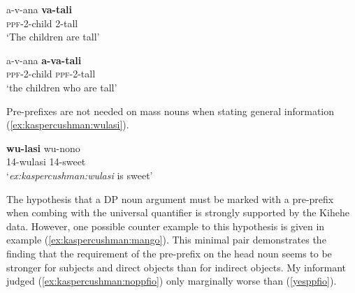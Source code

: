 \documentclass[output=paper,modfonts,nonflat]{langsci/langscibook}
\begin{document}
\begin{exe}

\ex \label{ex:kaspercushman:tall} \begin{xlist}

\ex 
\gll a-v-ana \textbf{va-tali} \\
\textsc{ppf}-2-child 2-tall  \\
\glt `The children are tall'


\ex 
\gll a-v-ana \textbf{a-va-tali} \\
\textsc{ppf}-2-child \textsc{ppf}-2-tall \\
\glt `the children who are tall'

\end{xlist}
\end{exe}

Pre-prefixes are not needed on mass nouns when stating general information (\ref{ex:kaspercushman:wulasi}). 


\begin{exe}

\ex \label{ex:kaspercushman:wulasi} 
\gll \textbf{wu-lasi} wu-nono \\
14-wulasi 14-sweet \\
\glt `\textit{ex:kaspercushman:wulasi} is sweet'

\end{exe}

The hypothesis that a DP noun argument must be marked with a pre-prefix when combing with the universal quantifier is strongly supported by the Kihehe data.  However, one possible counter example to this hypothesis is given in example (\ref{ex:kaspercushman:mango}). This minimal pair demonstrates the finding that the requirement of the pre-prefix on the head noun seems to be stronger for subjects and direct objects than for indirect objects.  My informant judged (\ref{ex:kaspercushman:noppfio}) only marginally worse than (\ref{yesppfio}). 
\end{document}
